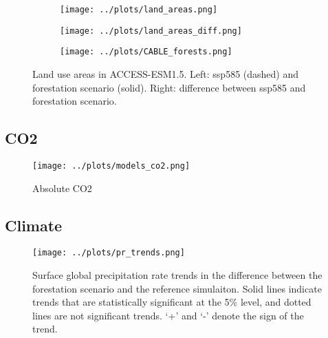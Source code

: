 \documentclass[]{article}
\begin{document}
\begin{figure}[H]
    \centering
    \begin{subfigure}[b]{0.45\linewidth}
        \texttt{[image: ../plots/land\_areas.png]}
    \end{subfigure}
    \begin{subfigure}[b]{0.45\linewidth}
        \texttt{[image: ../plots/land\_areas\_diff.png]}
    \end{subfigure}
    \begin{subfigure}[b]{0.45\linewidth}
        \texttt{[image: ../plots/CABLE\_forests.png]}
    \end{subfigure}
    \caption{Land use areas in ACCESS-ESM1.5. Left: ssp585 (dashed) and forestation scenario (solid). Right: difference between ssp585 and forestation scenario.}
    \label{fig:ACCESS_land_use}
\end{figure}

\subsection{CO2}

\begin{figure}[H]
    \centering
    \texttt{[image: ../plots/models\_co2.png]}
    \caption{Absolute CO2}
    \label{fig:models_co2_absolute}
\end{figure}

\subsection{Climate}

\begin{figure}[H]
    \centering
    \texttt{[image: ../plots/pr\_trends.png]}
    \caption{Surface global precipitation rate trends in the difference between the forestation scenario and the reference simulaiton. Solid lines indicate trends that are statistically significant at the 5\% level, and dotted lines are not significant trends. `+' and `-' denote the sign of the trend.}
    \label{fig:models_pr_trends}
\end{figure}
\end{document}
